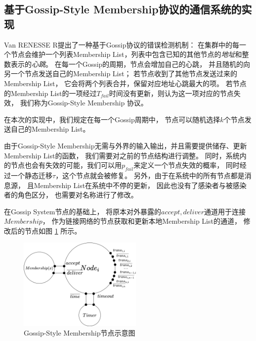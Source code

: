 \subsection{基于Gossip-Style Membership协议的通信系统的实现}\label{ch:membership_system}

Van RENESSE R提出了一种基于Gossip协议的错误检测机制：
在集群中的每一个节点会维护一个列表Membership List，列表中包含已知的其他节点的\textit{地址}和整数表示的\textit{心跳}。
在每一个Gossip的周期，节点会增加自己的心跳，
并且随机的向另一个节点发送自己的Membership List；
若节点收到了其他节点发送过来的Membership List，
它会将两个列表合并，保留对应地址心跳最大的项。
若节点的Membership List的一项经过$T_{fail}$时间没有更新，则认为这一项对应的节点失效\cite{Gossip_style}，
我们称为Gossip-Style Membership 协议。

在本次的实现中，我们规定在每一个Gossip周期中，
节点可以随机选择$k$个节点发送自己的Membership List。

由于Gossip-Style Membership无需与外界的输入输出，并且需要提供储存、更新Membership List的函数，
我们需要对之前的节点结构进行调整。
同时，系统内的节点也会有失效的可能，我们可以用$p_{fail}$来定义一个节点失效的概率，
同时经过一个静态迁移$\tau$，这个节点就会被修复。
另外，由于在系统中的所有节点都是消息源，
且Membership List在系统中不停的更新，
因此也没有了感染者与被感染者的角色区分，
也需要对名称进行了修改。

在Gossip System节点的基础上，
将原本对外暴露的$accept,deliver$通道用于连接$Membership$，
作为链接网络的节点获取和更新本地Membership List的通道，
修改后的节点如图
\ref{fig:membership_node}
所示。

\begin{figure}[!htbp]
	\small
	\centering
	\includegraphics[width=6cm]{../figures/Node.png}
    \caption{Gossip-Style Membership节点示意图}
    \label{fig:membership_node}
\end{figure}

